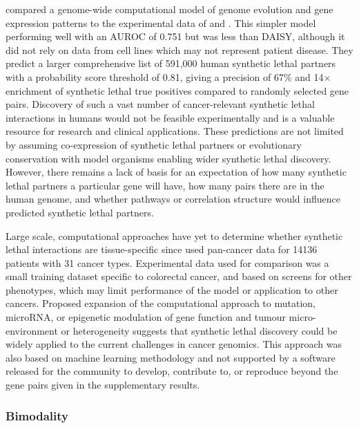 \citet{Lu2015} compared a genome-wide computational model of genome evolution and gene expression patterns to the experimental data of \citet{Vizeacoumar2013} and \citet{Laufer2013}. This simpler model performing well with an AUROC of 0.751 but was less than DAISY, although it did not rely on data from cell lines which may not represent patient disease. They predict a larger comprehensive list of 591,000 human synthetic lethal partners with a probability score threshold of 0.81, giving a precision of 67\% and 14$\times$ enrichment of synthetic lethal true positives compared to randomly selected gene pairs. Discovery of such a vast number of cancer-relevant synthetic lethal interactions in humans would not be feasible experimentally and is a valuable resource for research and clinical applications. These predictions are not limited by assuming co-expression of synthetic lethal partners or evolutionary conservation with model organisms enabling wider synthetic lethal discovery. However, there remains a lack of basis for an expectation of how many synthetic lethal partners a particular gene will have, how many pairs there are in the human genome, and whether pathways or correlation structure would influence predicted synthetic lethal partners. 

Large scale, computational approaches have yet to determine whether synthetic lethal interactions are tissue-specific since \citet{Lu2015} used pan-cancer data for 14136 patients with 31 cancer types. Experimental data used for comparison was a small training dataset specific to colorectal cancer, and based on screens for other phenotypes, which may limit performance of the model or application to other cancers. Proposed expansion of the computational approach to mutation, microRNA, or epigenetic modulation of gene function and tumour micro-environment or heterogeneity suggests that synthetic lethal discovery could be widely applied to the current challenges in cancer genomics. This approach was also based on machine learning methodology and not supported by a software released for the community to develop, contribute to, or reproduce beyond the gene pairs given in the supplementary results. 

\subsubsection{Bimodality}

